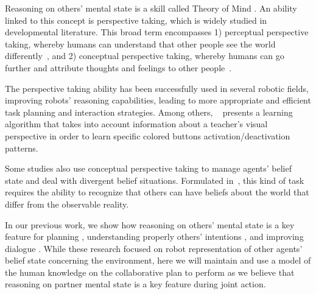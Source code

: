 \documentclass{llncs}
\begin{document}

Reasoning on others' mental state is a skill called Theory of Mind \cite{premack1978does}. An ability linked to this concept is perspective taking, which is widely studied in developmental literature. This broad term encompasses 1)
perceptual perspective taking, whereby 
humans can understand that other people see the world differently~\cite{Tversky1999}, and 2) 
conceptual perspective taking, whereby humans can go further and attribute thoughts and feelings to other people~\cite{Baron1985}.


The perspective taking ability has been successfully used in several robotic fields, improving robots' reasoning capabilities, leading to more appropriate and efficient task planning and interaction strategies.
Among others, ~\cite{breazeal2006} presents a learning algorithm that takes into account information about a teacher's visual perspective in order to learn specific colored buttons activation/deactivation patterns.

Some studies also use conceptual perspective taking to manage agents' belief state and deal with divergent belief situations. Formulated in~\cite{wimmer1983}, this kind of task requires the ability to recognize that others can have beliefs about the world that differ from the observable reality.

In our previous work, we show how reasoning on others' mental state is a key feature for planning \cite{guitton2012}, understanding properly others' intentions \cite{fiore2015}, and improving dialogue \cite{Ferreira2015}. While these research focused on robot representation of other agents' belief state concerning the environment, here we will maintain and use a model of the human knowledge on the collaborative plan to perform as we believe that reasoning on partner mental state is a key feature during joint action.
\end{document}
